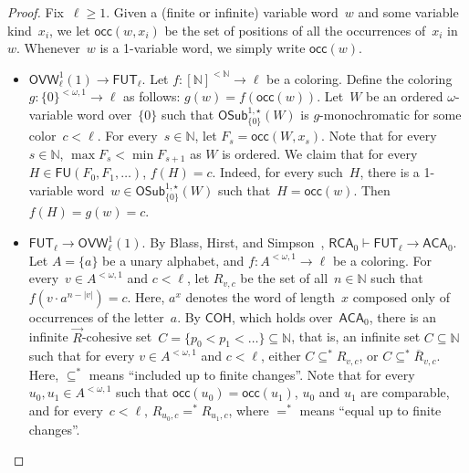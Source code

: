 \documentclass{article}
\numberwithin{theorem}{section}
\newtheorem{proposition}[theorem]{Proposition}
\newcommand{\RCA}{\mathsf{RCA}}
\newcommand{\COH}{\mathsf{COH}}
\newcommand{\ACA}{\mathsf{ACA}}
\newcommand{\OVW}{\mathsf{OVW}}
\newcommand{\FUT}{\mathsf{FUT}} %
\newcommand{\NN}{\mathbb{N}}
\newcommand{\OSub}{\mathsf{OSub}}
\newcommand{\FU}{\mathsf{FU}} %
\newcommand{\occ}{\mathsf{occ}} %
\def\qt#1{``#1''}%
\begin{document}
\begin{proof}
Fix~$\ell \geq 1$. Given a (finite or infinite) variable word~$w$ and some variable kind~$x_i$, we let $\occ(w, x_i)$ be the set of positions of all the occurrences of~$x_i$ in~$w$. Whenever~$w$ is a 1-variable word, we simply write $\occ(w)$.
\begin{itemize}
    \item $\OVW^1_\ell(1) \rightarrow \FUT_\ell$. Let $f : [\NN]^{<\NN} \to \ell$ be a coloring. Define the coloring $g : \{0\}^{<\omega,1} \to \ell$ as follows: $g(w) = f(\occ(w))$. Let~$W$ be an ordered $\omega$-variable word over~$\{0\}$ such that $\OSub^{1,\star}_{\{0\}}(W)$ is $g$-monochromatic for some color~$c < \ell$. For every~$s \in \NN$, let $F_s = \occ(W, x_s)$. Note that for every~$s \in \NN$, $\max F_s < \min F_{s+1}$ as $W$ is ordered. We claim that for every $H \in \FU(F_0, F_1, \dots )$, $f(H) = c$. Indeed, for every such~$H$, there is a 1-variable word~$w \in \OSub^{1,\star}_{\{0\}}(W)$ such that~$H = \occ(w)$. Then $f(H) = g(w) = c$.
    \item $\FUT_\ell \rightarrow \OVW^1_\ell(1)$. By Blass, Hirst, and Simpson~\cite{blass1987logical}, $\RCA_0 \vdash \FUT_\ell \to \ACA_0$. 
    Let $A = \{a\}$ be a unary alphabet, and $f : A^{<\omega, 1} \to \ell$ be a coloring. For every~$v \in A^{<\omega, 1}$ and $c < \ell$, let $R_{v,c}$ be the set of all~$n \in \NN$ such that $f(v \cdot a^{n-|v|}) = c$. Here, $a^x$ denotes the word of length~$x$ composed only of occurrences of the letter~$a$. 
    By $\COH$, which holds over~$\ACA_0$, there is an infinite $\vec{R}$-cohesive set~$C = \{ p_0 < p_1 < \dots \} \subseteq \NN$, that is, an infinite set $C \subseteq \NN$ such that for every $v \in A^{<\omega, 1}$ and $c < \ell$, either $C \subseteq^* R_{v,c}$, or $C \subseteq^* \overline{R}_{v,c}$. Here, $\subseteq^*$ means \qt{included up to finite changes}. Note that for every~$u_0, u_1 \in A^{<\omega,1}$ such that $\occ(u_0) = \occ(u_1)$, $u_0$ and $u_1$ are comparable, and for every~$c < \ell$, $R_{u_0,c} =^* R_{u_1,c}$, where $=^*$ means \qt{equal up to finite changes}. 

\end{itemize}
\end{proof}
\end{document}
